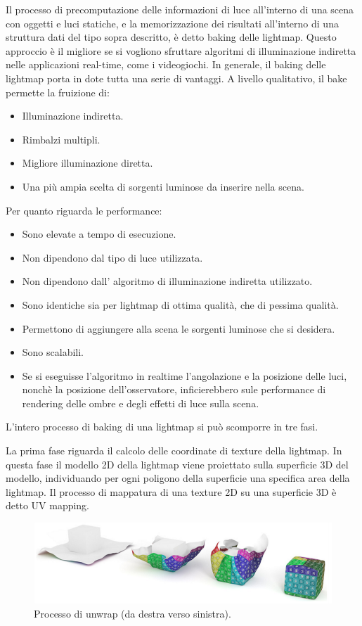 Il processo di precomputazione delle informazioni di luce all’interno di una scena con oggetti e luci statiche, e la memorizzazione dei risultati all’interno di una struttura dati del tipo sopra descritto, è detto baking delle lightmap. Questo approccio è il migliore se si vogliono sfruttare algoritmi di illuminazione indiretta nelle applicazioni real-time, come i videogiochi. In generale, il baking delle lightmap porta in dote tutta una serie di vantaggi.
A livello qualitativo, il bake permette la fruizione di:
\begin{itemize}
\item Illuminazione indiretta.
\item Rimbalzi multipli.
\item Migliore illuminazione diretta.
\item Una più ampia scelta di sorgenti luminose da inserire nella scena.
\end{itemize}
Per quanto riguarda le performance:
\begin{itemize}
\item Sono elevate a tempo di esecuzione.
\item Non dipendono dal tipo di luce utilizzata.
\item Non dipendono dall’ algoritmo di illuminazione indiretta utilizzato.
\item Sono identiche sia per lightmap di ottima qualità, che di pessima qualità.
\item Permettono di aggiungere alla scena le sorgenti luminose che si desidera.
\item Sono scalabili.
\item Se si eseguisse l’algoritmo in realtime l’angolazione e la posizione delle luci, nonchè la posizione dell’osservatore, inficierebbero sule performance di rendering delle ombre e degli effetti di luce sulla scena.
\end{itemize}
L’intero processo di baking di una lightmap si può scomporre in tre fasi.

La prima fase riguarda il calcolo delle coordinate di texture della lightmap.
In questa fase il modello 2D della lightmap viene proiettato sulla superficie 3D del modello, individuando per ogni poligono della superficie una specifica area della lightmap.
Il processo di mappatura di una texture 2D su una superficie 3D è detto UV mapping.
\\
\begin{figure}[htb]
 \centering
 \includegraphics[width=0.8\linewidth]{images/chapter_stato_arte/stato_arte_unwrap.png}\hfill
 \caption[Mappatura delle coordinate UV]{Processo di unwrap (da destra verso sinistra).}
 \label{fig:stato_arte_unwrap}
\end{figure}

